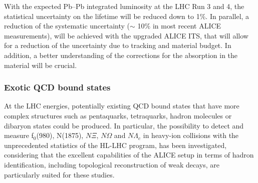 With the expected Pb--Pb integrated luminosity at the LHC Run 3 and 4, the statistical uncertainty on the lifetime will be reduced down to 1$\%$. 
In parallel, a reduction of the systematic uncertainty ($\sim$ 10$\%$ in most recent ALICE measurements), will be achieved with the upgraded 
ALICE ITS, that will allow for a reduction of the uncertainty due to tracking and material budget. 
In addition, a better understanding of the corrections for the absorption in the material will be crucial. 

\subsubsection{Exotic QCD bound states}

At the LHC energies, potentially existing 
QCD bound states that have more complex structures such as pentaquarks, tetraquarks, hadron molecules or dibaryon states could be produced.
In particular, the possibility to detect and measure f$_{0}$(980), N(1875), $N\Xi$, $N\Omega$ and $N\Lambda_c$ in heavy-ion collisions with the unprecedented statistics of the HL-LHC program, has been investigated, considering that the excellent capabilities of the ALICE setup in terms of hadron identification, including topological reconstruction of weak decays, are particularly suited for these studies.

